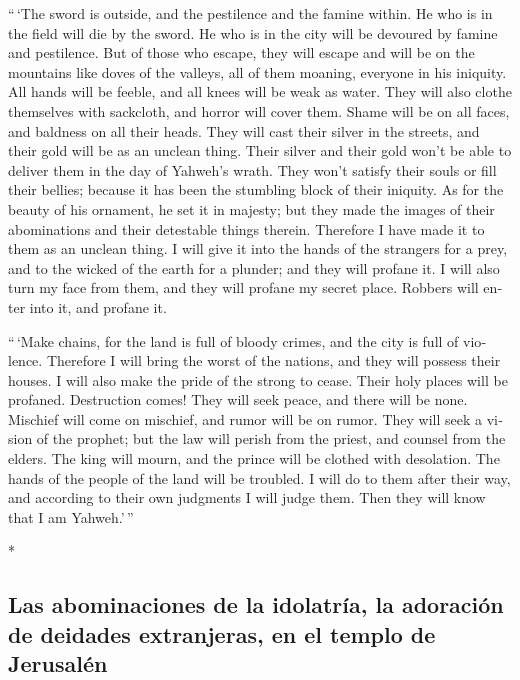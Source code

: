 \begin{paracol}{2}
\begin{otherlanguage}{english}
 ``\,`The sword is outside, and the pestilence and the
famine within. He who is in the field will die by the sword. He who is
in the city will be devoured by famine and pestilence. 
But of those who escape, they will escape and will be on the mountains
like doves of the valleys, all of them moaning, everyone in his
iniquity.  All hands will be feeble, and all knees will
be weak as water.  They will also clothe themselves with
sackcloth, and horror will cover them. Shame will be on all faces, and
baldness on all their heads.  They will cast their silver
in the streets, and their gold will be as an unclean thing. Their silver
and their gold won't be able to deliver them in the day of Yahweh's
wrath. They won't satisfy their souls or fill their bellies; because it
has been the stumbling block of their iniquity.  As for
the beauty of his ornament, he set it in majesty; but they made the
images of their abominations and their detestable things therein.
Therefore I have made it to them as an unclean thing.  I
will give it into the hands of the strangers for a prey, and to the
wicked of the earth for a plunder; and they will profane it.
 I will also turn my face from them, and they will
profane my secret place. Robbers will enter into it, and profane it.

 ``\,`Make chains, for the land is full of bloody crimes,
and the city is full of violence.  Therefore I will bring
the worst of the nations, and they will possess their houses. I will
also make the pride of the strong to cease. Their holy places will be
profaned.  Destruction comes! They will seek peace, and
there will be none.  Mischief will come on mischief, and
rumor will be on rumor. They will seek a vision of the prophet; but the
law will perish from the priest, and counsel from the elders.
 The king will mourn, and the prince will be clothed with
desolation. The hands of the people of the land will be troubled. I will
do to them after their way, and according to their own judgments I will
judge them. Then they will know that I am Yahweh.'\,''

\end{otherlanguage}

\switchcolumn[0]*

\hypertarget{las-abominaciones-de-la-idolatruxeda-la-adoraciuxf3n-de-deidades-extranjeras-en-el-templo-de-jerusaluxe9n}{%
\subsection{Las abominaciones de la idolatría, la adoración de deidades
extranjeras, en el templo de
Jerusalén}\label{las-abominaciones-de-la-idolatruxeda-la-adoraciuxf3n-de-deidades-extranjeras-en-el-templo-de-jerusaluxe9n}}


\end{paracol}

